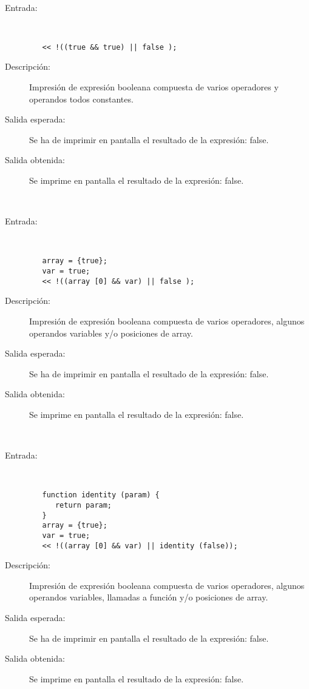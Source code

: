 \hfil \\
	\begin{description}
		\item [Entrada:] \hfill \\
\begin{lstlisting}
   << !((true && true) || false );
\end{lstlisting}
		\item [Descripción:] Impresión de expresión booleana compuesta de varios operadores y operandos todos constantes.
		\item [Salida esperada:] Se ha de imprimir en pantalla el resultado de la expresión: false.
		\item [Salida obtenida:] Se imprime en pantalla el resultado de la expresión: false.
	\end{description}
\hfil \\
	\begin{description}
		\item [Entrada:] \hfill \\
\begin{lstlisting}
   array = {true};
   var = true;
   << !((array [0] && var) || false );
\end{lstlisting}
		\item [Descripción:] Impresión de expresión booleana compuesta de varios operadores, algunos operandos variables y/o posiciones de array.
		\item [Salida esperada:] Se ha de imprimir en pantalla el resultado de la expresión: false.
		\item [Salida obtenida:] Se imprime en pantalla el resultado de la expresión: false.
	\end{description}
\hfil \\
	\begin{description}
		\item [Entrada:] \hfill \\
\begin{lstlisting}
   function identity (param) {
      return param;
   }
   array = {true};
   var = true;
   << !((array [0] && var) || identity (false));
\end{lstlisting}
		\item [Descripción:] Impresión de expresión booleana compuesta de varios operadores, algunos operandos variables, llamadas a función y/o posiciones de array.
		\item [Salida esperada:] Se ha de imprimir en pantalla el resultado de la expresión: false.
		\item [Salida obtenida:] Se imprime en pantalla el resultado de la expresión: false.
	\end{description}
